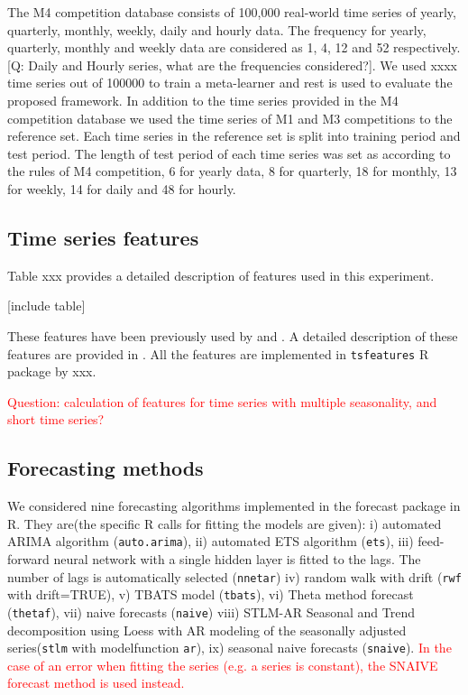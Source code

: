 \documentclass[11pt,a4paper,]{article}
\theoremstyle{definition}
\theoremstyle{definition}
\theoremstyle{definition}
\theoremstyle{remark}
\begin{document}
The M4 competition database consists of 100,000 real-world time series
of yearly, quarterly, monthly, weekly, daily and hourly data. The
frequency for yearly, quarterly, monthly and weekly data are considered
as 1, 4, 12 and 52 respectively. {[}Q: Daily and Hourly series, what are
the frequencies considered?{]}. We used xxxx time series out of 100000
to train a meta-learner and rest is used to evaluate the proposed
framework. In addition to the time series provided in the M4 competition
database we used the time series of M1 and M3 competitions
\autocite{makridakis2000m3} to the reference set. Each time series in
the reference set is split into training period and test period. The
length of test period of each time series was set as according to the
rules of M4 competition, 6 for yearly data, 8 for quarterly, 18 for
monthly, 13 for weekly, 14 for daily and 48 for hourly.

\subsection{Time series features}\label{time-series-features}

Table xxx provides a detailed description of features used in this
experiment.

{[}include table{]}

These features have been previously used by \textcite{fforms} and
\textcite{hyndman2015large}. A detailed description of these features
are provided in \textcite{fforms}. All the features are implemented in
\texttt{tsfeatures} R package by xxx.

\textcolor{red}{Question: calculation of features for time series with multiple seasonality, and short time series?}

\subsection{Forecasting methods}\label{forecasting-methods}

We considered nine forecasting algorithms implemented in the forecast
package in R. They are(the specific R calls for fitting the models are
given): i) automated ARIMA algorithm (\texttt{auto.arima}), ii)
automated ETS algorithm (\texttt{ets}), iii) feed-forward neural network
with a single hidden layer is fitted to the lags. The number of lags is
automatically selected (\texttt{nnetar}) iv) random walk with drift
(\texttt{rwf} with drift=TRUE), v) TBATS model (\texttt{tbats}), vi)
Theta method forecast (\texttt{thetaf}), vii) naive forecasts
(\texttt{naive}) viii) STLM-AR Seasonal and Trend decomposition using
Loess with AR modeling of the seasonally adjusted series(\texttt{stlm}
with modelfunction \texttt{ar}), ix) seasonal naive forecasts
(\texttt{snaive}).
\textcolor{red}{In the case of an error when fitting the series (e.g. a series is constant), the SNAIVE forecast method is used instead.}
\end{document}
